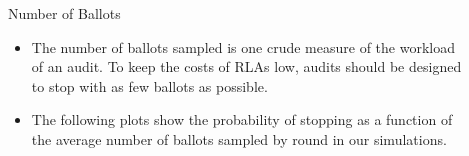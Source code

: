 \documentclass[final]{beamer}
\newlength{\sepwidth}
\newlength{\colwidth}
\newcommand{\separatorcolumn}{\begin{column}{\sepwidth}\end{column}}
\begin{document}
\begin{frame}[t]
\begin{columns}[t]
\begin{column}{\colwidth}
%    
%
\end{column}

\separatorcolumn

\begin{column}{\colwidth}


\begin{block}{Number of Ballots}
\begin{itemize}
\item
The number of ballots sampled is one crude measure of the workload of an audit.
To keep the costs of RLAs low, audits should be designed to stop with as few ballots as possible.
\item
The following plots show the probability of stopping as a function of the average number of ballots
sampled by round in our simulations.
\end{itemize}


\end{block}
\end{column}
\end{columns}
\end{frame}
\end{document}

